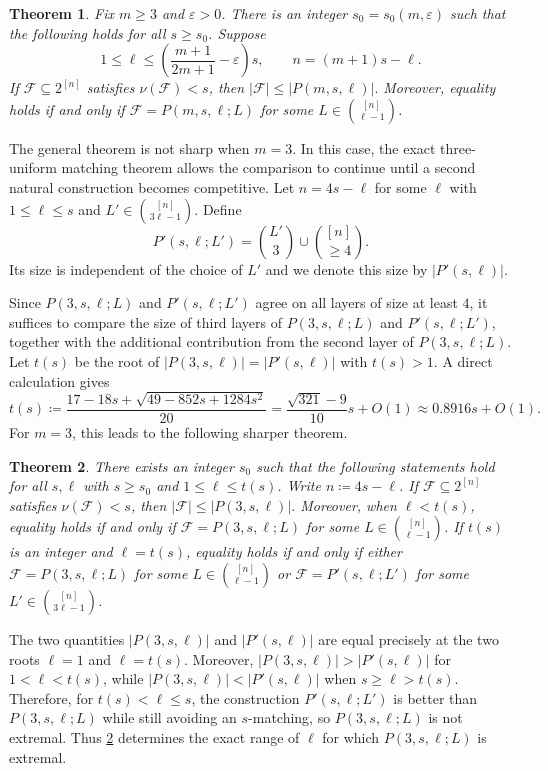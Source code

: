 \documentclass[10pt,a4paper]{article}
\numberwithin{equation}{section}
\newtheorem{theorem}{Theorem}[section]
\theoremstyle{definition}
\newcommand{\F}{\mathcal F}
\newcommand{\eps}{\varepsilon}
\begin{document}
\begin{theorem}\label{thm:main}
    Fix $m\ge3$ and $\eps>0$.  There is an integer
    $s_0=s_0(m,\eps)$ such that the following holds for all $s\ge s_0$.
    Suppose
    \[
        1\le \ell\le \left(\frac{m+1}{2m+1}-\eps\right)s,
        \qquad
        n=(m+1)s-\ell.
    \]
    If $\F\subseteq2^{[n]}$ satisfies $\nu(\F)<s$, then
    \(|\F|\le |P(m,s,\ell)|.\)
    Moreover, equality holds if and only if $\F=P(m,s,\ell;L)$
    for some $L\in\binom{[n]}{\ell-1}$.
\end{theorem}




The general theorem is not sharp when $m=3$.
In this case, the exact three-uniform matching theorem allows the comparison to continue until a second natural construction becomes competitive.
Let $n=4s-\ell$ for some $\ell$ with $1\le \ell\le s$ and $L'\in\binom{[n]}{3\ell-1}$.  Define
\[
    P'(s,\ell;L')
    =
    \binom{L'}3\cup\binom{[n]}{\ge4}.
\]
Its size is independent of the choice of $L'$ and we denote this size by $|P'(s,\ell)|$.

Since $P(3,s,\ell;L)$ and $P'(s,\ell;L')$ agree on all layers of size at least $4$, it suffices to compare the size of third layers of $P(3,s,\ell;L)$ and $P'(s,\ell;L')$, together with the additional contribution from the second layer of $P(3,s,\ell;L)$.
Let $t(s)$ be the root of $|P(3,s,\ell)|=|P'(s,\ell)|$ with $t(s)>1$.
A direct calculation gives
\[
    t(s)
    \coloneqq
    \frac{17-18s+\sqrt{49-852s+1284s^2}}{20}
    =
    \frac{\sqrt{321}-9}{10}s+O(1)\approx 0.8916s+O(1).
\]
For $m=3$, this leads to the following sharper theorem.
\begin{theorem}\label{thm:m3-lower-range}
    There exists an integer $s_0$ such that the following statements hold for
    all $s,\ell$ with $s\ge s_0$ and $1\le \ell\le t(s)$.
    Write $n\coloneqq 4s-\ell$.
    If $\F\subseteq2^{[n]}$ satisfies $\nu(\F)<s$, then
    \(|\F|\le |P(3,s,\ell)|.\)
    Moreover, when $\ell<t(s)$, equality holds if and only if
    $\F=P(3,s,\ell;L)$ for some $L\in\binom{[n]}{\ell-1}$.
    If $t(s)$ is an integer and $\ell=t(s)$, equality holds if and only if
    either $\F=P(3,s,\ell;L)$ for some
    $L\in\binom{[n]}{\ell-1}$ or
    $\F=P'(s,\ell;L')$ for some $L'\in\binom{[n]}{3\ell-1}$.
\end{theorem}

The two quantities $|P(3,s,\ell)|$ and
$|P'(s,\ell)|$ are equal precisely at the two roots $\ell=1$ and $\ell=t(s)$.
Moreover, $|P(3,s,\ell)|>|P'(s,\ell)|$ for $1<\ell<t(s)$, while
$|P(3,s,\ell)|<|P'(s,\ell)|$ when $s\ge\ell>t(s)$.
Therefore, for $t(s)<\ell\le s$, the construction $P'(s,\ell;L')$ is better
than $P(3,s,\ell;L)$ while still avoiding an $s$-matching, so
$P(3,s,\ell;L)$ is not extremal.
Thus \cref{thm:m3-lower-range} determines the exact range of $\ell$ for which
$P(3,s,\ell;L)$ is extremal.
\end{document}
